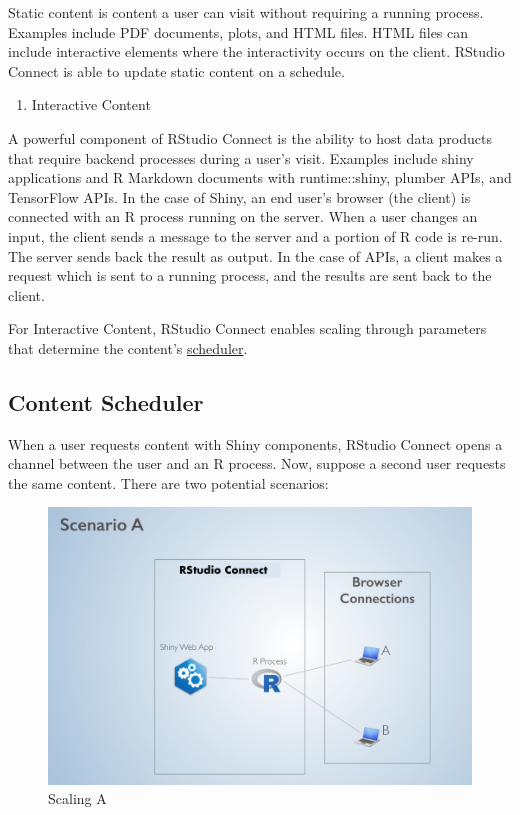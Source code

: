 \documentclass[]{book}
\providecommand{\tightlist}{%
  \setlength{\itemsep}{0pt}\setlength{\parskip}{0pt}}
\theoremstyle{definition}
\theoremstyle{definition}
\theoremstyle{definition}
\theoremstyle{remark}
\begin{document}
Static content is content a user can visit without requiring a running
process. Examples include PDF documents, plots, and HTML files. HTML
files can include interactive elements where the interactivity occurs on
the client. RStudio Connect is able to update static content on a
schedule.

\begin{enumerate}
\def\labelenumi{\arabic{enumi}.}
\setcounter{enumi}{1}
\tightlist
\item
  Interactive Content
\end{enumerate}

A powerful component of RStudio Connect is the ability to host data
products that require backend processes during a user's visit. Examples
include shiny applications and R Markdown documents with runtime::shiny,
plumber APIs, and TensorFlow APIs. In the case of Shiny, an end user's
browser (the client) is connected with an R process running on the
server. When a user changes an input, the client sends a message to the
server and a portion of R code is re-run. The server sends back the
result as output. In the case of APIs, a client makes a request which is
sent to a running process, and the results are sent back to the client.

For Interactive Content, RStudio Connect enables scaling through
parameters that determine the content's
\href{https://docs.rstudio.com/connect/admin/appendix-configuration.html\#appendix-configuration-scheduler}{scheduler}.

\hypertarget{content-scheduler}{%
\subsection{Content Scheduler}\label{content-scheduler}}

When a user requests content with Shiny components, RStudio Connect
opens a channel between the user and an R process. Now, suppose a second
user requests the same content. There are two potential scenarios:

\begin{figure}
\centering
\includegraphics{imgs/scaling/scaling-a.png}
\caption{Scaling A}
\end{figure}
\end{document}
